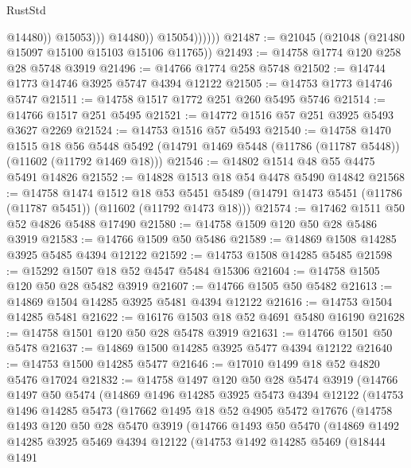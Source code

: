 \begin{lexlean}{RustStd}
\begin{coremodule}
                              @14480))
                          @15053)))
                    @14480))
                @15054))))))
@21487 := @21045 (@21048 (@21480 @15097 @15100 @15103 @15106 @11765))
@21493 := @14758 @1774 @120 @258 @28 @5748 @3919
@21496 := @14766 @1774 @258 @5748
@21502 := @14744 @1773 @14746 @3925 @5747 @4394 @12122
@21505 := @14753 @1773 @14746 @5747
@21511 := @14758 @1517 @1772 @251 @260 @5495 @5746
@21514 := @14766 @1517 @251 @5495
@21521 := @14772 @1516 @57 @251 @3925 @5493 @3627 @2269
@21524 := @14753 @1516 @57 @5493
@21540 := @14758
    @1470
    @1515
    @18
    @56
    @5448
    @5492
    (@14791 @1469 @5448 (@11786 (@11787 @5448)) (@11602 (@11792 @1469 @18)))
@21546 := @14802 @1514 @48 @55 @4475 @5491 @14826
@21552 := @14828 @1513 @18 @54 @4478 @5490 @14842
@21568 := @14758
    @1474
    @1512
    @18
    @53
    @5451
    @5489
    (@14791 @1473 @5451 (@11786 (@11787 @5451)) (@11602 (@11792 @1473 @18)))
@21574 := @17462 @1511 @50 @52 @4826 @5488 @17490
@21580 := @14758 @1509 @120 @50 @28 @5486 @3919
@21583 := @14766 @1509 @50 @5486
@21589 := @14869 @1508 @14285 @3925 @5485 @4394 @12122
@21592 := @14753 @1508 @14285 @5485
@21598 := @15292 @1507 @18 @52 @4547 @5484 @15306
@21604 := @14758 @1505 @120 @50 @28 @5482 @3919
@21607 := @14766 @1505 @50 @5482
@21613 := @14869 @1504 @14285 @3925 @5481 @4394 @12122
@21616 := @14753 @1504 @14285 @5481
@21622 := @16176 @1503 @18 @52 @4691 @5480 @16190
@21628 := @14758 @1501 @120 @50 @28 @5478 @3919
@21631 := @14766 @1501 @50 @5478
@21637 := @14869 @1500 @14285 @3925 @5477 @4394 @12122
@21640 := @14753 @1500 @14285 @5477
@21646 := @17010 @1499 @18 @52 @4820 @5476 @17024
@21832 := @14758
    @1497
    @120
    @50
    @28
    @5474
    @3919
    (@14766
      @1497
      @50
      @5474
      (@14869
        @1496
        @14285
        @3925
        @5473
        @4394
        @12122
        (@14753
          @1496
          @14285
          @5473
          (@17662
            @1495
            @18
            @52
            @4905
            @5472
            @17676
            (@14758
              @1493
              @120
              @50
              @28
              @5470
              @3919
              (@14766
                @1493
                @50
                @5470
                (@14869
                  @1492
                  @14285
                  @3925
                  @5469
                  @4394
                  @12122
                  (@14753
                    @1492
                    @14285
                    @5469
                    (@18444
                      @1491

\end{coremodule}
\end{lexlean}
